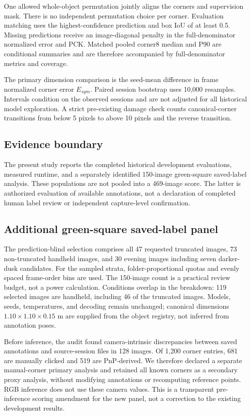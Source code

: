 \documentclass[journal]{IEEEtran}
\begin{document}
One allowed whole-object permutation jointly aligns the corners and supervision mask. There is no independent permutation choice per corner. Evaluation matching uses the highest-confidence prediction and box IoU of at least 0.5. Missing predictions receive an image-diagonal penalty in the full-denominator normalized error and PCK. Matched pooled corner8 median and P90 are conditional summaries and are therefore accompanied by full-denominator metrics and coverage.

The primary dimension comparison is the seed-mean difference in frame normalized corner error $E_{sym}$. Paired session bootstrap uses 10,000 resamples. Intervals condition on the observed sessions and are not adjusted for all historical model exploration. A strict pre-existing damage check counts canonical-corner transitions from below 5 pixels to above 10 pixels and the reverse transition.

\subsection{Evidence boundary}
The present study reports the completed historical development evaluations, measured runtime, and a separately identified 150-image green-square saved-label analysis. These populations are not pooled into a 469-image score. The latter is authorized evaluation of available annotations, not a declaration of completed human label review or independent capture-level confirmation.

\subsection{Additional green-square saved-label panel}
The prediction-blind selection comprises all 47 requested truncated images, 73 non-truncated handheld images, and 30 evening images including seven darker-dusk candidates. For the sampled strata, folder-proportional quotas and evenly spaced frame-order bins are used. The 150-image count is a practical review budget, not a power calculation. Conditions overlap in the breakdown: 119 selected images are handheld, including 46 of the truncated images. Models, seeds, temperatures, and decoding remain unchanged; canonical dimensions $1.10\times1.10\times0.15$ m are supplied from the object registry, not inferred from annotation poses.

Before inference, the audit found camera-intrinsic discrepancies between saved annotations and source-session files in 128 images. Of 1,200 corner entries, 681 are manually clicked and 519 are PnP-derived. We therefore declared a separate manual-corner primary analysis and retained all known corners as a secondary proxy analysis, without modifying annotations or recomputing reference points. RGB inference does not use these camera values. This is a transparent pre-inference scoring amendment for the new panel, not a correction to the existing development results.
\end{document}
